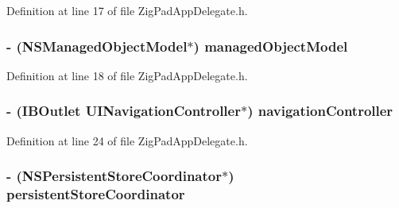 Definition at line 17 of file ZigPadAppDelegate.h.

\hypertarget{interface_zig_pad_app_delegate_a351b86d68f8de51693578d7a822ab420}{
\subsubsection[{managedObjectModel}]{\setlength{\rightskip}{0pt plus 5cm}-\/ (NSManagedObjectModel$\ast$) managedObjectModel}}
\label{interface_zig_pad_app_delegate_a351b86d68f8de51693578d7a822ab420}


Definition at line 18 of file ZigPadAppDelegate.h.

\hypertarget{interface_zig_pad_app_delegate_ac9e552549e66f8099eb374aa8afc8dc5}{
\subsubsection[{navigationController}]{\setlength{\rightskip}{0pt plus 5cm}-\/ (IBOutlet UINavigationController$\ast$) navigationController}}
\label{interface_zig_pad_app_delegate_ac9e552549e66f8099eb374aa8afc8dc5}


Definition at line 24 of file ZigPadAppDelegate.h.

\hypertarget{interface_zig_pad_app_delegate_a0a0142fa9c72a6dff5aad52371563234}{
\subsubsection[{persistentStoreCoordinator}]{\setlength{\rightskip}{0pt plus 5cm}-\/ (NSPersistentStoreCoordinator$\ast$) persistentStoreCoordinator}}
\label{interface_zig_pad_app_delegate_a0a0142fa9c72a6dff5aad52371563234}


